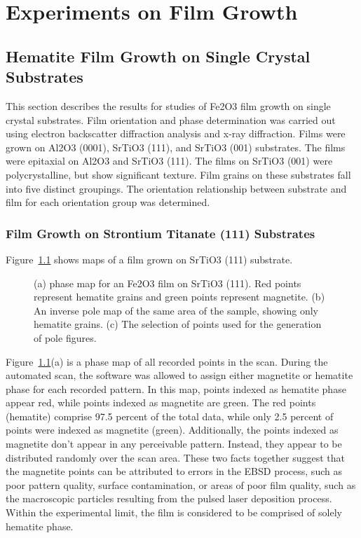 \documentclass[12pt,%
              twoside,
               letterpaper]{uiothesis}
\begin{document}
	
	\part{Experiments on Film Growth}



\chapter{Hematite Film Growth on Single Crystal Substrates}
\label{ch:single.crystal.growth}


This section describes the results for studies of Fe2O3 film growth on
single crystal substrates. Film orientation and phase determination was carried out using
electron backscatter diffraction analysis and x-ray diffraction. Films were grown on
Al2O3 (0001), SrTiO3 (111), and SrTiO3 (001) substrates. The films were
epitaxial on Al2O3 and SrTiO3 (111). The films on SrTiO3 (001) were
polycrystalline, but show significant texture. Film grains on these substrates fall into
five distinct groupings. The orientation relationship between substrate and film for each
orientation group was determined.


\section{Film Growth on Strontium Titanate (111) Substrates}
\label{sec:single.growth.111}


Figure~\ref{fig:111maps} shows  maps of a film grown on SrTiO3 (111) substrate. 
\begin{figure}
	\caption[ maps for film on SrTiO3 (111)]{%
		(a)  phase map for an Fe2O3 film on SrTiO3 
		(111). Red points represent hematite grains and green points 
		represent magnetite. (b) An inverse pole map of the same area 
		of the sample, showing only hematite grains. (c) The selection 
		of points used for the generation of pole figures.}
	\label{fig:111maps}
\end{figure}
Figure~\ref{fig:111maps}(a) is a phase map of all recorded points in the scan. During the
automated scan, the  software was allowed to assign either magnetite or hematite phase
for each recorded pattern. In this map, points indexed as hematite phase appear red, while
points indexed as magnetite are green. The red points (hematite) comprise 97.5 percent of
the total data, while only 2.5 percent of points were indexed as magnetite (green).
Additionally, the points indexed as magnetite don't appear in any perceivable pattern.
Instead, they appear to be distributed randomly over the scan area. These two facts
together suggest that the magnetite points can be attributed to errors in the EBSD
process, such as poor pattern quality, surface contamination, or areas of poor film
quality, such as the macroscopic particles resulting from the pulsed laser deposition
process. Within the experimental limit, the film is considered to be comprised of solely
hematite phase. 
\end{document}
